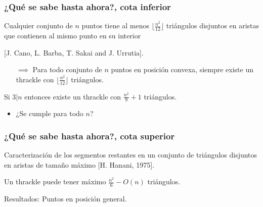 \documentclass{beamer}
\begin{document}
\begin{frame}
  \frametitle{¿Qué se sabe hasta ahora?, cota inferior}
  Cualquier conjunto de $n$ puntos tiene al menos $\lfloor\frac{n^2}{12}\rfloor$ triángulos
  disjuntos en aristas que contienen al mismo punto en su interior

  [J. Cano, L. Barba, T. Sakai and J. Urrutia].
  \begin{figure}[htb]
    \def\svgwidth{3cm}
    
  \end{figure}
  \begin{itemize}[leftmargin=2cm]
    \item[$\implies$] Para todo conjunto de $n$ puntos en posición convexa, siempre existe un
      thrackle con $\lfloor\frac{n^2}{12}\rfloor$ triángulos.
  \end{itemize}
  Si $3|n$ entonces existe un thrackle con $\frac{n^2}{9}+1$ triángulos.
  \begin{itemize}[leftmargin=1cm]
    \item ¿Se cumple para todo $n$?
  \end{itemize}
\end{frame}

\begin{frame}
  \frametitle{¿Qué se sabe hasta ahora?, cota superior}
  Caracterización de los segmentos restantes en un conjunto de triángulos
  disjuntos en aristas de tamaño máximo [H. Hanani, 1975].
  \begin{figure}[htb]
    \scriptsize
    
  \end{figure}
  Un thrackle puede tener máximo $\frac{n^2}{6}-O(n)$ triángulos.
\end{frame}

\begin{frame}[c]
  \begin{center}
    \Huge Resultados: Puntos en posición general.
  \end{center}
\end{frame}
\end{document}
